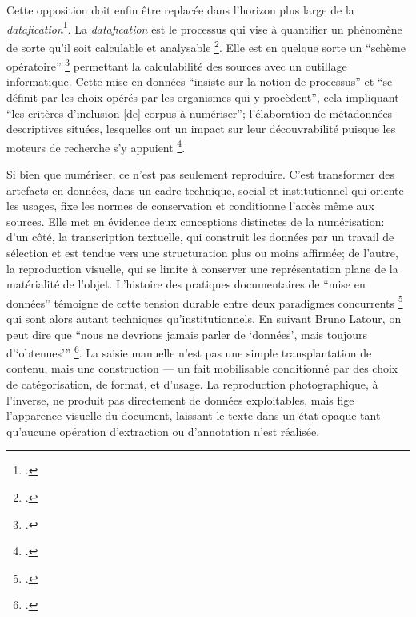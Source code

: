 Cette opposition doit enfin être replacée dans l’horizon plus large de la \emph{datafication}\footcite[][]{clavert}. La \emph{datafication} est le processus qui vise à quantifier un phénomène de sorte qu'il soit calculable et analysable \footcite[][]{clavert}. Elle est en quelque sorte un \enquote{schème opératoire} \footcite[][p. 236]{meot} permettant la calculabilité des sources avec un outillage informatique. Cette mise en données \enquote{insiste sur la notion de processus} et \enquote{se définit par les choix opérés par les organismes qui y procèdent}, cela impliquant \enquote{les critères d'inclusion [de] corpus à numériser}; l'élaboration de métadonnées descriptives situées, lesquelles ont un impact sur leur découvrabilité puisque les moteurs de recherche s'y appuient \footcite[][p. 123]{clavert}.

Si bien que numériser, ce n’est pas seulement reproduire. C’est transformer des artefacts en données, dans un cadre technique, social et institutionnel qui oriente les usages, fixe les normes de conservation et conditionne l’accès même aux sources. Elle met en évidence deux conceptions distinctes de la numérisation: d’un côté, la transcription textuelle, qui construit les données par un travail de sélection et est tendue vers une structuration plus ou moins affirmée; de l’autre, la reproduction visuelle, qui se limite à conserver une représentation plane de la matérialité de l’objet. L’histoire des pratiques documentaires de \enquote{mise en données} témoigne de cette tension durable entre deux paradigmes concurrents \footcite[][p. 29]{bermesbook} qui sont alors autant techniques qu'institutionnels. En suivant Bruno Latour, on peut dire que \enquote{nous ne devrions jamais parler de ‘données’, mais toujours d'‘obtenues’} \footcite[][]{goeta}. La saisie manuelle n'est pas une simple transplantation de contenu, mais une construction — un fait mobilisable conditionné par des choix de catégorisation, de format, et d’usage. La reproduction photographique, à l’inverse, ne produit pas directement de données exploitables, mais fige l’apparence visuelle du document, laissant le texte dans un état opaque tant qu’aucune opération d’extraction ou d’annotation n’est réalisée. 

